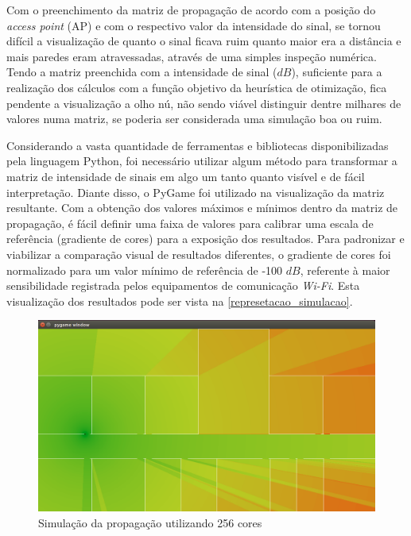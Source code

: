 \documentclass[
	12pt,				%
	twoside,			%
	a4paper,			%
	english,			%
	french,				%
	spanish,			%
	brazil				%
	]{abntex2}
\begin{document}
Com o preenchimento da matriz de propagação de acordo com a posição do
\emph{access point} (AP) e com o respectivo valor da intensidade do
sinal, se tornou difícil a visualização de quanto o sinal ficava ruim
quanto maior era a distância e mais paredes eram atravessadas, através
de uma simples inspeção numérica. Tendo a matriz preenchida com a
intensidade de sinal (\(dB\)), suficiente para a realização dos cálculos
com a função objetivo da heurística de otimização, fica pendente a
visualização a olho nú, não sendo viável distinguir dentre milhares de
valores numa matriz, se poderia ser considerada uma simulação boa ou
ruim.

Considerando a vasta quantidade de ferramentas e bibliotecas
disponibilizadas pela linguagem Python, foi necessário utilizar algum
método para transformar a matriz de intensidade de sinais em algo um
tanto quanto visível e de fácil interpretação. Diante disso, o PyGame
foi utilizado na visualização da matriz resultante. Com a obtenção dos
valores máximos e mínimos dentro da matriz de propagação, é fácil
definir uma faixa de valores para calibrar uma escala de referência
(gradiente de cores) para a exposição dos resultados. Para padronizar e
viabilizar a comparação visual de resultados diferentes, o gradiente de
cores foi normalizado para um valor mínimo de referência de -100 \(dB\),
referente à maior sensibilidade registrada pelos equipamentos de
comunicação \emph{Wi-Fi}. Esta visualização dos resultados pode ser
vista na \autoref{represetacao_simulacao}.

\begin{figure}[ht]
    \caption{\label{represetacao_simulacao} Simulação da propagação utilizando 256 cores}
    \begin{center}
        \includegraphics[scale=0.4]{imagens/representacao-simulacao.jpg}
    \end{center}
\end{figure}
\end{document}
